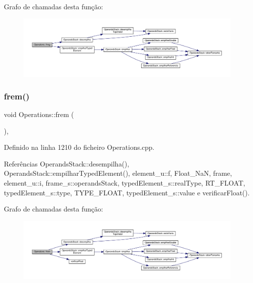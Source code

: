 Grafo de chamadas desta função\+:\nopagebreak
\begin{figure}[H]
\begin{center}
\leavevmode
\includegraphics[width=350pt]{classOperations_a17a7d8f333373d30ae5b1595d96594e5_cgraph}
\end{center}
\end{figure}
\mbox{\label{classOperations_ad29eac4f222e4b74667086c3da0d5538}} 
\subsubsection{\texorpdfstring{frem()}{frem()}}
{\footnotesize\ttfamily void Operations\+::frem (\begin{DoxyParamCaption}{ }\end{DoxyParamCaption})\hspace{0.3cm}{\ttfamily [static]}, {\ttfamily [private]}}



Definido na linha 1210 do ficheiro Operations.\+cpp.



Referências Operands\+Stack\+::desempilha(), Operands\+Stack\+::empilhar\+Typed\+Element(), element\+\_\+u\+::f, Float\+\_\+\+NaN, frame, element\+\_\+u\+::i, frame\+\_\+s\+::operands\+Stack, typed\+Element\+\_\+s\+::real\+Type, R\+T\+\_\+\+F\+L\+O\+AT, typed\+Element\+\_\+s\+::type, T\+Y\+P\+E\+\_\+\+F\+L\+O\+AT, typed\+Element\+\_\+s\+::value e verificar\+Float().

Grafo de chamadas desta função\+:\nopagebreak
\begin{figure}[H]
\begin{center}
\leavevmode
\includegraphics[width=350pt]{classOperations_ad29eac4f222e4b74667086c3da0d5538_cgraph}
\end{center}
\end{figure}
\mbox{\label{classOperations_a701431fe6d5d20fafa747dbeae90e1d4}} 
